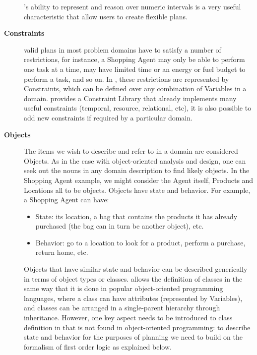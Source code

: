 \begin{description}
  \eu's ability to represent and reason over numeric intervals is a
  very useful characteristic that allow users to create flexible
  plans. 

\item[\textbf{Constraints}] valid plans in most problem domains have
  to satisfy a number of restrictions, for instance, a Shopping Agent
  may only be able to perform one task at a time, may have limited
  time or an energy or fuel budget to perform a task, and so on. In
  \eu, these restrictions are represented by Constraints, which can be
  defined over any combination of Variables in a domain. \eu provides
  a Constraint Library that already implements many useful constraints
  (temporal, resource, relational, etc), it is also possible to add
  new constraints if required by a particular domain.

\item[\textbf{Objects}] The items we wish to describe and refer to in
  a domain are considered Objects. As in the case with object-oriented
  analysis and design, one can seek out the nouns in any domain
  description to find likely objects. In the Shopping Agent example,
  we might consider the Agent itself, Products and Locations all to be
  objects. Objects have state and behavior. For example, a Shopping
  Agent can have:

  \begin{itemize}

  \item State: its location, a bag that contains the products it has
    already purchased (the bag can in turn be another object), etc.

  \item Behavior: go to a location to look for a product, perform a
    purchase, return home, etc.

  \end{itemize}

  Objects that have similar state and behavior can be described
  generically in terms of object types or classes. \eu allows the
  definition of classes in the same way that it is done in popular
  object-oriented programming languages, where a class can have
  attributes (represented by Variables), and classes can be arranged
  in a single-parent hierarchy through inheritance.  However, one key
  aspect needs to be introduced to class definition in \eu that is not
  found in object-oriented programming: to describe state and behavior
  for the purposes of planning we need to build on the formalism of
  first order logic as explained below.


\end{description}

